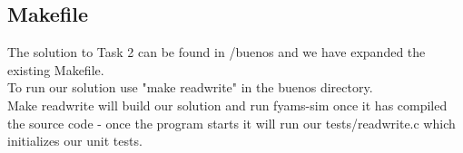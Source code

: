 \documentclass[a4paper,12pt,danish]{report}
\begin{document}
\subsection{Makefile}
The solution to Task 2 can be found in /buenos and we have expanded the existing Makefile.
\\
To run our solution use "make readwrite" in the buenos directory.
\\
Make readwrite will build our solution and run fyams-sim once it has compiled the source code - once the program starts it will run our tests/readwrite.c which initializes our unit tests.
\end{document}
